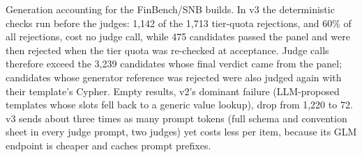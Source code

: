 \begin{table}[t]
\caption{Generation accounting for the FinBench/SNB builds. In v3 the deterministic checks run before the judges: 1,142 of the 1,713 tier-quota rejections, and 60\% of all rejections, cost no judge call, while 475 candidates passed the panel and were then rejected when the tier quota was re-checked at acceptance. Judge calls therefore exceed the 3,239 candidates whose final verdict came from the panel; candidates whose generator reference was rejected were also judged again with their template's Cypher. Empty results, v2's dominant failure (LLM-proposed templates whose slots fell back to a generic value lookup), drop from 1,220 to 72. v3 sends about three times as many prompt tokens (full schema and convention sheet in every judge prompt, two judges) yet costs less per item, because its GLM endpoint is cheaper and caches prompt prefixes.}
\label{tab:generation}
\end{table}
